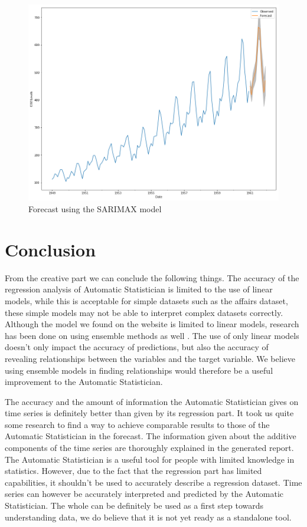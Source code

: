 \documentclass[a4paper, 10pt, conference]{ieeeconf}
\begin{document}
\begin{figure}[!ht]
    \centering
    \includegraphics[width=\linewidth]{report/images/airpax_sarimax.png}
    \caption{Forecast using the SARIMAX model}
    \label{fig:airpax_sarimax}
\end{figure}

\section{Conclusion}
\label{sec:conclusion}

From the creative part we can conclude the following things.
The accuracy of the regression analysis of Automatic Statistician is limited to the use of linear models, while this is acceptable for simple datasets such as the affairs dataset, these simple models may not be able to interpret complex datasets correctly. Although the model we found on the website is limited to linear models, research has been done on using ensemble methods as well \cite{moola2015a}. The use of only linear models doesn't only impact the accuracy of predictions, but also the accuracy of revealing relationships between the variables and the target variable. We believe using ensemble models in finding relationships would therefore be a useful improvement to the Automatic Statistician.

The accuracy and the amount of information the Automatic Statistician gives on time series is definitely better than given by its regression part. It took us quite some research to find a way to achieve comparable results to those of the Automatic Statistician in the forecast. The information given about the additive components of the time series are thoroughly explained in the generated report.\\

The Automatic Statistician is a useful tool for people with limited knowledge in statistics. However, due to the fact that the regression part has limited capabilities, it shouldn't be used to accurately describe a regression dataset. Time series can however be accurately interpreted and predicted by the Automatic Statistician. The whole can be definitely be used as a first step towards understanding data, we do believe that it is not yet ready as a standalone tool.



\end{document}
